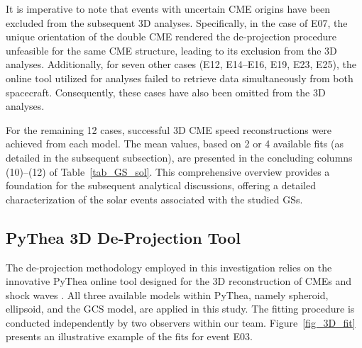 It is imperative to note that events with uncertain CME origins have been excluded from the subsequent 3D analyses. Specifically, in the case of E07, the unique orientation of the double CME rendered the de-projection procedure unfeasible for the same CME structure, leading to its exclusion from the 3D analyses. Additionally, for seven other cases (E12, E14–E16, E19, E23, E25), the online tool utilized for analyses failed to retrieve data simultaneously from both spacecraft. Consequently, these cases have also been omitted from the 3D analyses.

For the remaining 12 cases, successful 3D CME speed reconstructions were achieved from each model. The mean values, based on 2 or 4 available fits (as detailed in the subsequent subsection), are presented in the concluding columns (10)–(12) of Table~\ref{tab_GS_sol}. This comprehensive overview provides a foundation for the subsequent analytical discussions, offering a detailed characterization of the solar events associated with the studied GSs.

\subsection{PyThea 3D De-Projection Tool}
The de-projection methodology employed in this investigation relies on the innovative PyThea online tool designed for the 3D reconstruction of CMEs and shock waves \citep{kouloumvakos_2022}. All three available models within PyThea, namely spheroid, ellipsoid, and the GCS model, are applied in this study. The fitting procedure is conducted independently by two observers within our team. Figure~\ref{fig_3D_fit} presents an illustrative example of the fits for event E03.

